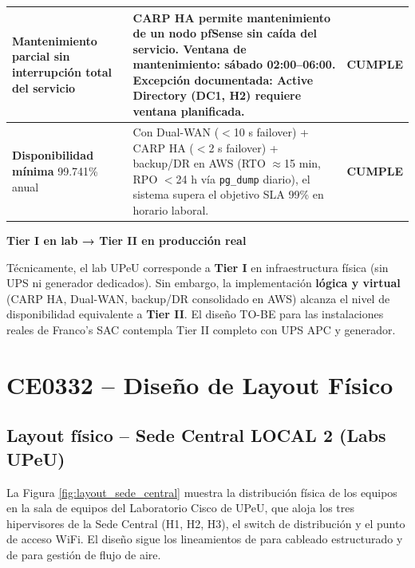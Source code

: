 \documentclass[11pt, a4paper, oneside]{report}
\newenvironment{notabox}[1]{%
  \begin{lrbox}{\notaboxsb}%
  \begin{minipage}{\dimexpr\textwidth-2\fboxsep\relax}%
  \vspace{4pt}\textcolor{upeu_dark}{\textbf{#1}}\\[2pt]\small%
}{%
  \vspace{4pt}%
  \end{minipage}%
  \end{lrbox}%
  \vspace{6pt}\par\noindent\colorbox{upeu_light}{\usebox{\notaboxsb}}\par\vspace{6pt}%
}
\begin{document}
\begin{xltabular}{\textwidth}{@{}|L{3.6cm}|X|C{2cm}|@{}}
{\small \textbf{Mantenimiento parcial} sin interrupción total del servicio} & {\small CARP HA permite mantenimiento de un nodo pfSense sin caída del servicio. Ventana de mantenimiento: sábado 02:00--06:00. Excepción documentada: Active Directory (DC1, H2) requiere ventana planificada.} & {\small \textcolor{sev_bajo}{\textbf{CUMPLE}}} \\ \hline

{\small \textbf{Disponibilidad mínima} 99.741\% anual} & {\small Con Dual-WAN ($<$10 s failover) + CARP HA ($<$2 s failover) + backup/DR en AWS (RTO $\approx$15 min, RPO $<$24 h vía \texttt{pg\_dump} diario), el sistema supera el objetivo SLA 99\% en horario laboral.} & {\small \textcolor{sev_bajo}{\textbf{CUMPLE}}} \\ \hline

\end{xltabular}
\normalsize

\begin{notabox}{Tier I en lab → Tier II en producción real}
Técnicamente, el lab UPeU corresponde a \textbf{Tier I} en infraestructura física (sin UPS ni generador dedicados). Sin embargo, la implementación \textbf{lógica y virtual} (CARP HA, Dual-WAN, backup/DR consolidado en AWS) alcanza el nivel de disponibilidad equivalente a \textbf{Tier II}. El diseño TO-BE para las instalaciones reales de Franco's SAC contempla Tier II completo con UPS APC y generador.
\end{notabox}

\chapter{CE0332 -- Diseño de Layout Físico}


\section{Layout físico -- Sede Central LOCAL 2 (Labs UPeU)}

La Figura \ref{fig:layout_sede_central} muestra la distribución física de los equipos en la sala de equipos del Laboratorio Cisco de UPeU, que aloja los tres hipervisores de la Sede Central (H1, H2, H3), el switch de distribución y el punto de acceso WiFi. El diseño sigue los lineamientos de \citet{tia942} para cableado estructurado y de \citet{ashraetc99} para gestión de flujo de aire.
\end{document}
